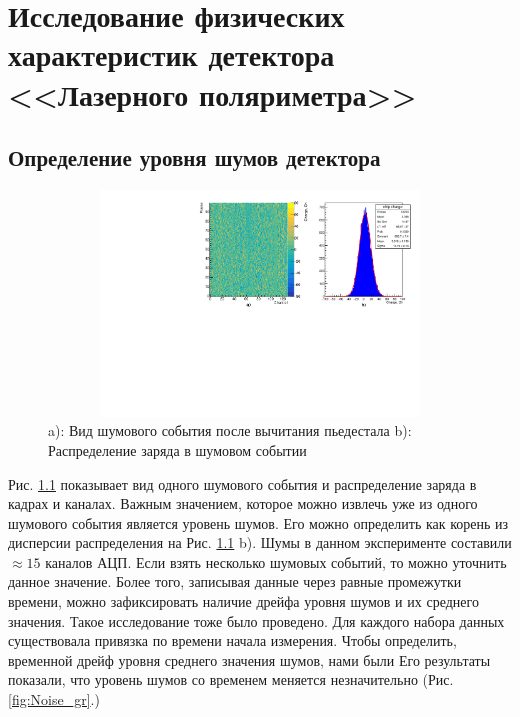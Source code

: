 \chapter{Исследование физических характеристик детектора <<Лазерного поляриметра>>}
\section{Определение уровня шумов детектора}
\label{sec:noise_study}
\begin{figure}[H]
	\begin{center}
		\includegraphics[width = 12cm, height = 6cm]{img/noise_map.pdf}
		\caption{a): Вид шумового события после вычитания пьедестала b): Распределение заряда в шумовом событии}
		\label{noise_map}
	\end{center}
\end{figure}
Рис. \ref{noise_map} показывает вид одного шумового события и распределение заряда в кадрах и каналах. Важным значением, которое можно извлечь уже из одного шумового события является уровень шумов. Его можно определить как корень из дисперсии распределения на Рис. \ref{noise_map} b). Шумы в данном эксперименте составили $\approx15$ каналов АЦП. Если взять несколько шумовых событий, то можно уточнить данное значение. Более того, записывая данные через равные промежутки времени, можно зафиксировать наличие дрейфа уровня шумов и их среднего значения. Такое исследование тоже было проведено. Для каждого набора данных существовала привязка по времени начала измерения. Чтобы определить, временной дрейф уровня среднего значения шумов, нами были Его результаты показали, что уровень шумов со временем меняется незначительно (Рис.\ref{fig:Noise_gr}.)

